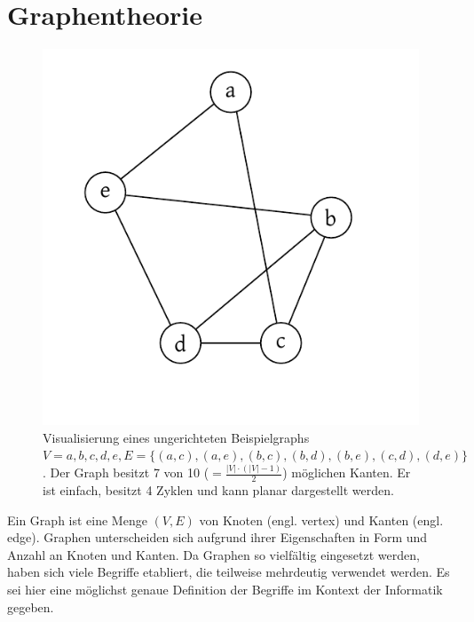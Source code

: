 \chapter{Graphentheorie}
%
\begin{figure}[p]
 \begin{center}
  \includegraphics{img/example_graph.pdf}
  \caption{
      Visualisierung eines ungerichteten Beispielgraphs $V = {a, b, c, d, e},
      E = \{(a, c), (a, e), (b, c), (b, d), (b, e), (c, d), (d, e)\}$.
      Der Graph besitzt 7 von 10 ($= \frac{|V| \cdot (|V|-1)}{2}$) möglichen Kanten.
      Er ist einfach, besitzt 4 Zyklen und kann planar dargestellt werden.
  }
  \label{fig:example_graph}
 \end{center}
\end{figure}

Ein Graph ist eine Menge $(V, E)$ von Knoten (engl. vertex) und Kanten (engl. edge). Graphen unterscheiden sich aufgrund ihrer Eigenschaften in Form und Anzahl an Knoten und Kanten. Da Graphen so vielfältig eingesetzt werden, haben sich viele Begriffe etabliert, die teilweise mehrdeutig verwendet werden. Es sei hier eine möglichst genaue Definition der Begriffe im Kontext der Informatik gegeben.

